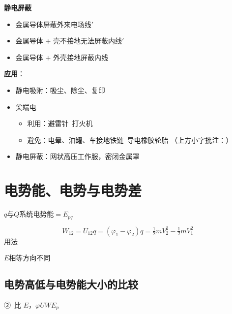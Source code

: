 \textbf{静电屏蔽}
\begin{itemize}
\item 金属导体\quad 屏蔽外来电场线$'$
\item 金属导体 $+$ 壳不接地\quad 无法屏蔽内线$'$
\item 金属导体 $+$ 外壳接地\quad 屏蔽内线
\end{itemize}


\textbf{应用}：
\begin{itemize}
\item 静电吸附：吸尘、除尘、复印
\item 尖端电 %
\begin{itemize}
\item 利用：避雷针\ 打火机
\item 避免：电晕、油罐、车接地铁链\ 导电橡胶轮胎
（上方小字批注：）
\end{itemize}
\item 静电屏蔽：网状高压工作服，密闭金属罩
\end{itemize}


\section{电势能、电势与电势差}

$q$与$Q$系统电势能$=E_{pq}$

\[ W_{12}=U_{12}q=(\varphi_1-\varphi_2)q=\tfrac12mV_2^2-\tfrac12mV_1^2 \]
用法

$E$相等\quad 方向不同

\subsection{电势高低与电势能大小的比较}
②\ 比 $E$，$\varphi$\quad $U$\quad $W$\quad $E_{p}$

